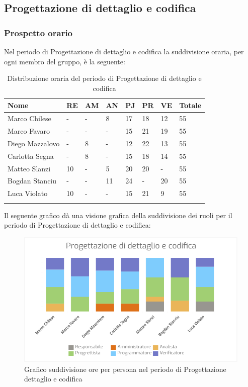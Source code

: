 \newpage
\subsection{Progettazione di dettaglio e codifica}
\subsubsection{Prospetto orario}

Nel periodo di Progettazione di dettaglio e codifica la suddivisione oraria, per ogni membro del gruppo, è la seguente:

\begin{longtable}{|C{.30\textwidth}|C{.06\textwidth}|C{.06\textwidth}|C{.06\textwidth} | C{.06\textwidth}| C{.06\textwidth} | C{.06\textwidth} | C{.10\textwidth} |}
	\hline
	\textbf{Nome} & \textbf{RE} & \textbf{AM} & \textbf{AN} & \textbf{PJ} & \textbf{PR} & \textbf{VE} & \textbf{Totale}\\
	\hline 
	Marco Chilese & - & - & 8 & 17 & 18 & 12 & 55 \\
	\hline
	Marco Favaro &  - & - & - & 15 & 21 & 19 & 55 \\
	\hline
	Diego Mazzalovo & - & 8 & - & 12 & 22 & 13 & 55 \\
	\hline
	Carlotta Segna & - & 8 & - & 15 & 18 & 14 & 55 \\
	\hline
	Matteo Slanzi & 10 & - & 5 & 20 & 20 & - & 55 \\
	\hline
	Bogdan Stanciu & - & - & 11 & 24 & - & 20 & 55 \\
	\hline
	Luca Violato & 10 & - & - & 15 & 21 & 9 & 55 \\   
	\hline


\caption{Distribuzione oraria del periodo di Progettazione di dettaglio e codifica}
\label{Distribuzione oraria del periodo di Progettazione di dettaglio e codifica}
\end{longtable}

Il seguente grafico dà una visione grafica della suddivisione dei ruoli per il periodo di Progettazione di dettaglio e codifica:

\begin{figure}[H]
	\centering
	\includegraphics[width=1\linewidth]{./images/Bar_progettazione_dettaglio_codifica.png}
	\caption{Grafico suddivisione ore per persona nel periodo di Progettazione  dettaglio e codifica}
	\label{fig:grafico suddivione ruoli periodo di Progettazione di dettaglio e codifica}
\end{figure}

